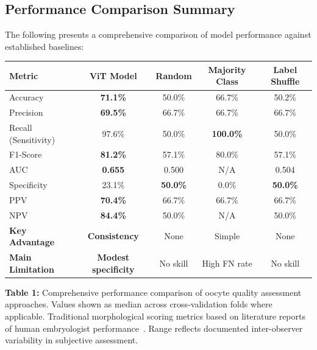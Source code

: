 \subsection{Performance Comparison Summary}

The following presents a comprehensive comparison of model performance against established baselines:

\begin{center}
\small
\begin{tabular}{lcccc}
\hline
\textbf{Metric} & \textbf{ViT Model} & \textbf{Random} & \textbf{Majority Class} & \textbf{Label Shuffle} \\
\hline
Accuracy & \textbf{71.1\%} & 50.0\% & 66.7\% & 50.2\% \\
Precision & \textbf{69.5\%} & 66.7\% & 66.7\% & 66.7\% \\
Recall (Sensitivity) & 97.6\% & 50.0\% & \textbf{100.0\%} & 50.0\% \\
F1-Score & \textbf{81.2\%} & 57.1\% & 80.0\% & 57.1\% \\
AUC & \textbf{0.655} & 0.500 & N/A & 0.504 \\
Specificity & 23.1\% & \textbf{50.0\%} & 0.0\% & \textbf{50.0\%} \\
PPV & \textbf{70.4\%} & 66.7\% & 66.7\% & 66.7\% \\
NPV & \textbf{84.4\%} & 50.0\% & N/A & 50.0\% \\
\hline
\textbf{Key Advantage} & \textbf{Consistency} & None & Simple & None \\
\textbf{Main Limitation} & \textbf{Modest specificity} & No skill & High FN rate & No skill \\
\hline
\end{tabular}
\end{center}

\textbf{Table 1:} Comprehensive performance comparison of oocyte quality assessment approaches. Values shown as median across cross-validation folds where applicable. Traditional morphological scoring metrics based on literature reports of human embryologist performance~\cite{paternot2009observer,paternot2011multicentre,fordham2022embryologist}. Range reflects documented inter-observer variability in subjective assessment. 